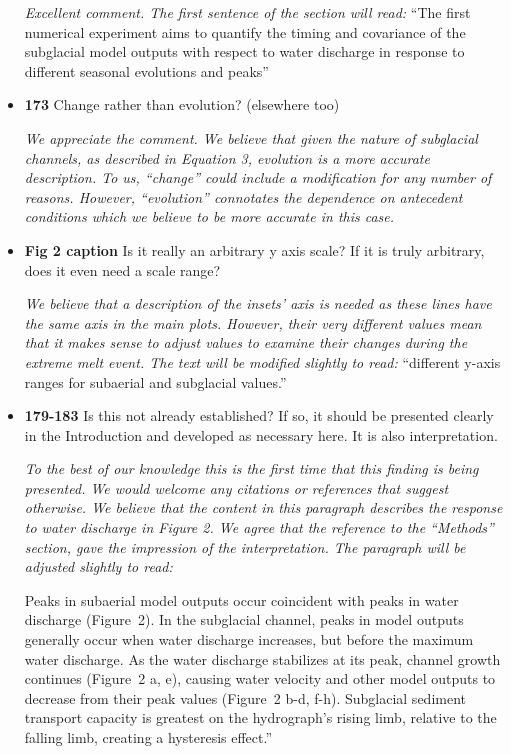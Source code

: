 \documentclass[11pt]{article}
\begin{document}
\begin{itemize}
 \textit{Excellent comment. The first sentence of the section will read:} ``The first numerical experiment aims to quantify the timing and covariance of the subglacial model outputs with respect to water discharge in response to different seasonal evolutions and peaks''

\item \textbf{173} Change rather than evolution? (elsewhere too)

  \textit{We appreciate the comment. We believe that given the nature of subglacial channels, as described in Equation 3, evolution is a more accurate description. To us, ``change'' could include a modification for any number of reasons. However,
    ``evolution'' connotates the dependence on antecedent conditions which we believe to be more accurate in this case. }
  
\item \textbf{Fig 2 caption} Is it really an arbitrary y axis scale? If it is truly arbitrary, does it even need
  a scale range?

  \textit{We believe that a description of the insets' axis is needed as these lines have the same axis in the main plots. However, their very different values mean that it makes sense to adjust values to examine their changes during the extreme melt event. The text will be modified slightly to read:} ``different y-axis ranges for subaerial and subglacial values.''


  
\item \textbf{179-183} Is this not already established? If so, it should be presented clearly in the
  Introduction and developed as necessary here. It is also interpretation.

  \textit{ To the best of our knowledge this is the first time that this finding is being presented.
    We would welcome any citations or references that suggest otherwise. We believe that the content in this paragraph describes the response to water discharge in Figure 2. We agree that the reference to the ``Methods'' section, gave the impression of the interpretation. The paragraph will be adjusted slightly to read:}


    Peaks in subaerial model outputs occur coincident with peaks in water discharge (Figure~2).
    In the subglacial channel, peaks in model outputs generally occur when water discharge increases, but before the maximum water discharge.
    As the water discharge stabilizes at its peak, channel growth continues (Figure~2 a, e), causing water velocity and other model outputs to decrease from their peak values (Figure~2 b-d, f-h).
    Subglacial sediment transport capacity is greatest on the hydrograph's rising limb, relative to the falling limb, creating a hysteresis effect.''
  

\end{itemize}
\end{document}
